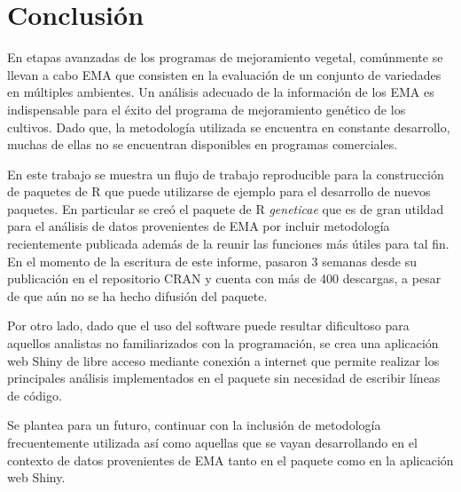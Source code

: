 \chapter{Conclusión}

En etapas avanzadas de los programas de mejoramiento vegetal, comúnmente se llevan a cabo EMA que consisten en la evaluación de un conjunto de variedades en múltiples ambientes. Un análisis adecuado de la información de los EMA es indispensable para el éxito del programa de mejoramiento genético de los cultivos. Dado que, la metodología utilizada se encuentra en constante desarrollo, muchas de ellas no se encuentran disponibles en programas comerciales. 

En este trabajo se muestra un flujo de trabajo reproducible para la construcción de paquetes de R que puede utilizarse de ejemplo para el desarrollo de nuevos paquetes. En particular se creó el paquete de R \emph{geneticae} que es de gran utildad para el análisis de datos provenientes de EMA por incluir metodología recientemente publicada además de la reunir las funciones más útiles para tal fin. En el momento de la escritura de este informe, pasaron 3 semanas desde su publicación en el repositorio CRAN y cuenta con más de 400 descargas, a pesar de que aún no se ha hecho difusión del paquete. 

Por otro lado, dado que el uso del software puede resultar dificultoso para aquellos analistas no familiarizados con la programación, se crea una aplicación web Shiny de libre acceso mediante conexión a internet que permite realizar los principales análisis implementados en el paquete sin necesidad de escribir líneas de código.

Se plantea para un futuro, continuar con la inclusión de metodología frecuentemente utilizada así como aquellas que se vayan desarrollando en el contexto de datos provenientes de EMA tanto en el paquete como en la aplicación web Shiny. 




